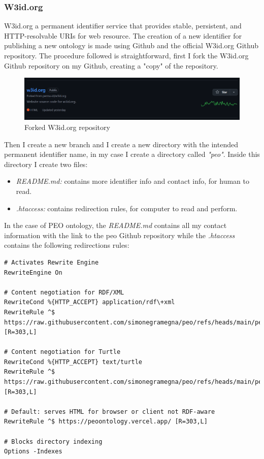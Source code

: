 \subsubsection{W3id.org}
W3id.org a permanent identifier service that provides stable, persistent, and HTTP-resolvable URIs for web resource. The creation of a new identifier for publishing a new ontology is made using Github and the official W3id.org Github repository. The procedure followed is straightforward, first I fork the W3id.org Github repository on my Github, creating a "copy" of the repository. 
\begin{figure}[H]
    \centering
    \includegraphics[width=0.9\linewidth]{Figures/fig_65.png}
    \caption{Forked W3id.org repository}
    \label{fig:enter-label}
\end{figure}
Then I create a new branch and I create a new directory with the intended permanent identifier name, in my case I create a directory called \textit{"peo"}. Inside this directory I create two files:
\begin{itemize}
    \item \textit{README.md:} contains more identifier info and contact info, for human to read.
    \item \textit{.htaccess:} contains redirection rules, for computer to read and perform.
\end{itemize}
In the case of PEO ontology, the \textit{README.md} contains all my contact information with the link to the peo Github repository while the \textit{.htaccess} contains the following redirections rules:
\begin{lstlisting}
# Activates Rewrite Engine
RewriteEngine On

# Content negotiation for RDF/XML
RewriteCond %{HTTP_ACCEPT} application/rdf\+xml
RewriteRule ^$ https://raw.githubusercontent.com/simonegramegna/peo/refs/heads/main/peo_ontology.rdf [R=303,L]

# Content negotiation for Turtle
RewriteCond %{HTTP_ACCEPT} text/turtle
RewriteRule ^$ https://raw.githubusercontent.com/simonegramegna/peo/refs/heads/main/peo_ontology.ttl [R=303,L]

# Default: serves HTML for browser or client not RDF-aware
RewriteRule ^$ https://peoontology.vercel.app/ [R=303,L]

# Blocks directory indexing
Options -Indexes
\end{lstlisting}
